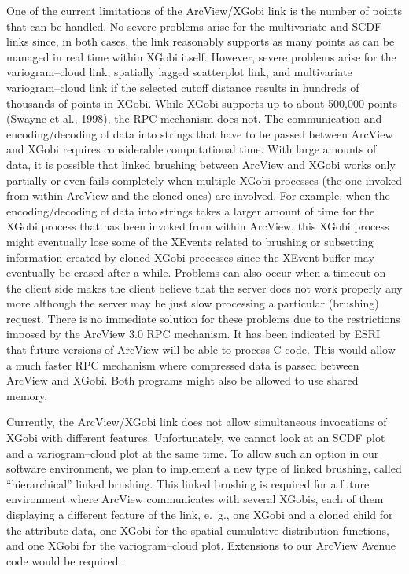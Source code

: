 One of the current limitations of the ArcView/XGobi link is the number
of points that can be handled. No severe problems arise for the
multivariate and SCDF links since, in both cases, the link reasonably
supports as many points as can be managed in real time within XGobi
itself. However, severe problems arise for
the variogram--cloud link, spatially lagged scatterplot link, and
multivariate variogram--cloud link if the selected cutoff distance
results in hundreds of thousands of points in XGobi.  While XGobi supports
up to about 500,000 points (Swayne et al., 1998), the RPC mechanism
does not. The communication and encoding/decoding of data into strings
that have to be passed between ArcView and XGobi requires considerable
computational time. With large amounts of data, it is possible that
linked brushing between ArcView and XGobi works only partially or
even fails completely when multiple XGobi processes (the one invoked
from within ArcView and the cloned ones) are involved.
For example, when the encoding/decoding of data into strings
takes a larger amount of time for the XGobi process that has been
invoked from within ArcView, this XGobi process might eventually
lose some of the XEvents related to brushing or subsetting information
created by cloned XGobi processes since the XEvent buffer may eventually
be erased after a while. Problems can also occur when a timeout
on the client side makes the client believe that the server does not
work properly any more although the server may be just slow processing
a particular (brushing) request.
There is no immediate solution for these problems due to the restrictions
imposed by the ArcView 3.0 RPC mechanism. It has been indicated by
ESRI that future versions of ArcView will be able to process C
code. This would allow a much faster RPC mechanism where compressed
data is passed between ArcView and XGobi. Both programs might also be
allowed to use shared memory.

Currently, the ArcView/XGobi link does not allow simultaneous
invocations of XGobi with different features. Unfortunately, we cannot
look at an SCDF plot and a variogram--cloud plot at the same time. To
allow such an option in our software environment, we plan to implement
a new type of linked brushing, called ``hierarchical'' linked
brushing. This linked brushing is required for a future environment
where ArcView communicates with several XGobis, each of them
displaying a different feature of the link, e.~g., one XGobi and a
cloned child for the attribute data, one XGobi for the spatial
cumulative distribution functions, and one XGobi for the
variogram--cloud plot. Extensions to our ArcView Avenue code
would be required.


